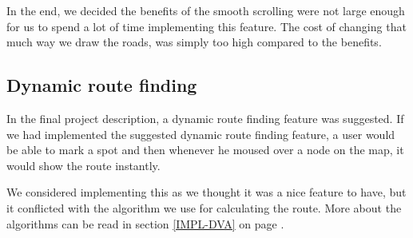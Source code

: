 In the end, we decided the benefits of the smooth scrolling were not large enough
for us to spend a lot of time implementing this feature. The cost of changing that  
much way we draw the roads, was simply too high compared to the benefits.

\subsection{Dynamic route finding}
\label{UIA-NI-DRF}
In the final project description, a dynamic route finding feature was
suggested. If we had implemented the suggested dynamic route finding feature, a
user would be able to mark a spot and then whenever he moused over a node on the
map, it would show the route instantly.

We considered implementing this as we thought it was a
nice feature to have, but it conflicted with the algorithm we use for
calculating the route. More about the algorithms can be read in section
\ref{IMPL-DVA}  on page \pageref{IMPL-DVA}.
